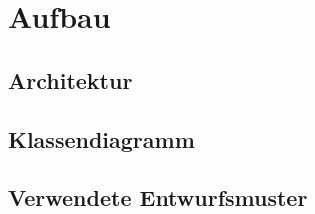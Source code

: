 \chapter{Aufbau}



\section{Architektur}

\section{Klassendiagramm}

\section{Verwendete Entwurfsmuster}